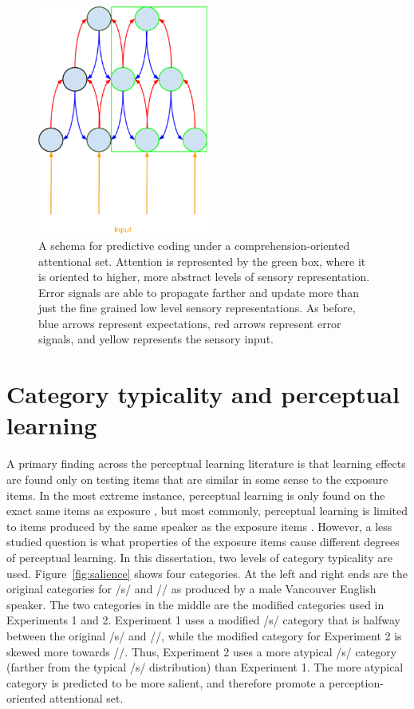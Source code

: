 \begin{figure}[!ht]
\caption{A schema for predictive coding under a comprehension-oriented attentional set. Attention is represented by the green box, where it is oriented to higher, more abstract levels of sensory representation.  Error signals are able to propagate farther and update more than just the fine grained low level sensory representations. As before, blue arrows represent expectations, red arrows represent error signals, and yellow represents the sensory input.}
\label{fig:predictivecodingcomprehension}
\begin{center}
\includegraphics[width=0.5\textwidth]{pictures/comprehension_predictive_coding}
\end{center}
\end{figure}

\section{Category typicality and perceptual learning}
\label{sec:signal}

A primary finding across the perceptual learning literature is that learning effects are found only on testing items that are similar in some sense to the exposure items.  
In the most extreme instance, perceptual learning is only found on the exact same items as exposure \citep{Reinisch2014}, but most commonly, perceptual learning is limited to items produced by the same speaker as the exposure items \citep{Norris2003,Reinisch2013}.  
However, a less studied question is what properties of the exposure items cause different degrees of perceptual learning.
In this dissertation, two levels of category typicality are used.
Figure~\ref{fig:salience} shows four categories.
At the left and right ends are the original categories for /s/ and /\textesh/ as produced by a male Vancouver English speaker.
The two categories in the middle are the modified categories used in Experiments 1 and 2.
Experiment 1 uses a modified /s/ category that is halfway between the original /s/ and /\textesh/, while the modified category for Experiment 2 is skewed more towards /\textesh/.
Thus, Experiment 2 uses a more atypical /s/ category (farther from the typical /s/ distribution) than Experiment 1.
The more atypical category is predicted to be more salient, and therefore promote a perception-oriented attentional set.


